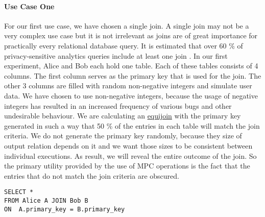 \paragraph{Use Case One}
For our first use case, we have chosen a single join. A single join may not be a very complex use case but it is not irrelevant as joins are of great importance for practically every relational database query. It is estimated that over 60 \% of privacy-sensitive analytics queries include at least one join \cite{johnson2017practical}. In our first experiment, Alice and Bob each hold one table. Each of these tables consists of 4 columns. The first column serves as the primary key that is used for the join. The other 3 columns are filled with random non-negative integers and simulate user data. We have chosen to use non-negative integers, because the usage of negative integers has resulted in an  increased frequency of various bugs and other undesirable behaviour. We are calculating an \hyperref[Databases]{equijoin}  with the primary key generated in such a way that 50 \% of the entries in each table will match the join criteria. We do not generate the primary key randomly, because they size of output relation depends on it and we want those sizes to be consistent between individual executions. As result, we will reveal the entire outcome of the join. So the primary utility provided by the use of MPC operations is the fact that the entries that do not match the join criteria are obscured.

\label{SQL1_label}				
\begin{lstlisting}[caption={ Functional equivalent SQL statement for our first use case  }]
SELECT * 
FROM Alice A JOIN Bob B 
ON  A.primary_key = B.primary_key
\end{lstlisting}
\label{SQL1}
	\label{Use Case two}		
